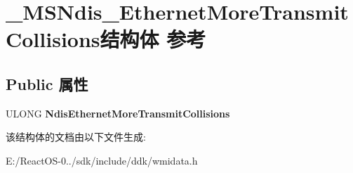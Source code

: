 \hypertarget{struct___m_s_ndis___ethernet_more_transmit_collisions}{}\section{\+\_\+\+M\+S\+Ndis\+\_\+\+Ethernet\+More\+Transmit\+Collisions结构体 参考}
\label{struct___m_s_ndis___ethernet_more_transmit_collisions}
\subsection*{Public 属性}
\begin{DoxyCompactItemize}
\item 
\mbox{\label{struct___m_s_ndis___ethernet_more_transmit_collisions_a3c90a7758203ef58ad95ea25d5c9c563}} 
U\+L\+O\+NG {\bfseries Ndis\+Ethernet\+More\+Transmit\+Collisions}
\end{DoxyCompactItemize}


该结构体的文档由以下文件生成\+:\begin{DoxyCompactItemize}
\item 
E\+:/\+React\+O\+S-\/0../sdk/include/ddk/wmidata.\+h\end{DoxyCompactItemize}
